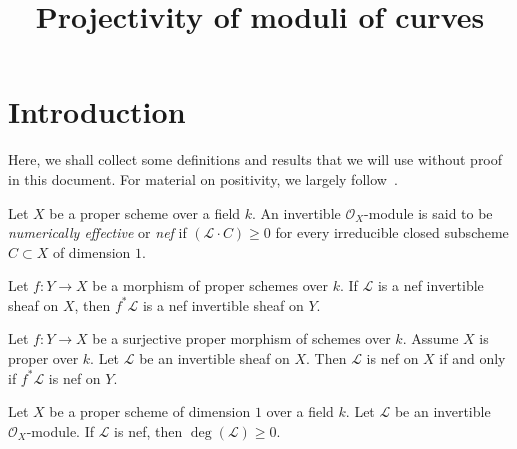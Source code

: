 


\title{Projectivity of moduli of curves}
\maketitle
\tableofcontents

\section{Introduction}
\label{section-introduction}
Here, we shall collect some definitions and results that we will use without
proof in this document.
For material on positivity, we largely follow~\cite{lazI,lazII}.

\begin{definition}
\label{definition-nef-invertible-sheaf}
Let $X$ be a proper scheme over a field $k$.
An invertible $\mathcal{O}_X$-module is said to be \emph{numerically effective}
or \emph{nef} if $(\mathcal{L} \cdot C) \geq 0$ for every irreducible closed
subscheme $C \subset X$ of dimension $1$.
\end{definition}

\begin{lemma}
\label{lemma-nef-pullback-nef}
\begin{reference}
\cite[Example 1.4.4(i)]{lazI}
\end{reference}
Let $f : Y \to X$ be a morphism of proper schemes over $k$.
If $\mathcal{L}$ is a nef invertible sheaf on $X$,
then $f^*\mathcal{L}$ is a nef invertible sheaf on $Y$.
\end{lemma}

\begin{lemma}
\label{lemma-nef-proper-surjective-nef}
\begin{reference}
\cite[Example 1.4.4(ii)]{lazI}
\end{reference}
Let $f : Y \to X$ be a surjective proper morphism of schemes over $k$.
Assume $X$ is proper over $k$.
Let $\mathcal{L}$ be an invertible sheaf on $X$.
Then $\mathcal{L}$ is nef on $X$ if and only if $f^*\mathcal{L}$ is nef on $Y$.
\end{lemma}

\begin{lemma}
\label{lemma-degree-of-nef-on-curve}
Let $X$ be a proper scheme of dimension $1$ over a field $k$.
Let $\mathcal{L}$ be an invertible $\mathcal{O}_X$-module.
If $\mathcal{L}$ is nef, then $\deg(\mathcal{L}) \geq 0$.
\end{lemma}

